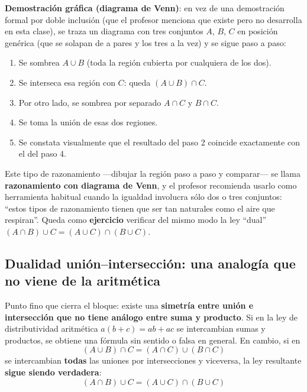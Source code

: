 \documentclass[12pt,a4paper]{article}
\begin{document}
\textbf{Demostración gráfica (diagrama de Venn)}: en vez de una demostración formal por doble inclusión (que el profesor menciona que existe pero no desarrolla en esta clase), se traza un diagrama con tres conjuntos $A$, $B$, $C$ en posición genérica (que se solapan de a pares y los tres a la vez) y se sigue paso a paso:

\begin{enumerate}
  \item Se sombrea $A \cup B$ (toda la región cubierta por cualquiera de los dos).
  \item Se interseca esa región con $C$: queda $(A\cup B)\cap C$.
  \item Por otro lado, se sombrea por separado $A \cap C$ y $B \cap C$.
  \item Se toma la unión de esas dos regiones.
  \item Se constata visualmente que el resultado del paso 2 coincide exactamente con el del paso 4.
\end{enumerate}

\begin{notebox}
Este tipo de razonamiento —dibujar la región paso a paso y comparar— se llama \textbf{razonamiento con diagrama de Venn}, y el profesor recomienda usarlo como herramienta habitual cuando la igualdad involucra sólo dos o tres conjuntos: ``estos tipos de razonamiento tienen que ser tan naturales como el aire que respiran''. Queda como \textbf{ejercicio} verificar del mismo modo la ley ``dual'' $(A \cap B) \cup C = (A \cup C) \cap (B \cup C)$.
\end{notebox}



\subsection{Dualidad unión--intersección: una analogía que no viene de la aritmética}

Punto fino que cierra el bloque: existe una \textbf{simetría entre unión e intersección que no tiene análogo entre suma y producto}. Si en la ley de distributividad aritmética $a(b+c) = ab+ac$ se intercambian sumas y productos, se obtiene una fórmula sin sentido o falsa en general. En cambio, si en
$$(A \cup B) \cap C = (A \cap C) \cup (B \cap C)$$
se intercambian \textbf{todas} las uniones por intersecciones y viceversa, la ley resultante \textbf{sigue siendo verdadera}:
$$(A \cap B) \cup C = (A \cup C) \cap (B \cup C)$$
\end{document}
